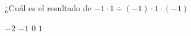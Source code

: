 \documentclass[spanish,letterpaper, 12pt, addpoints, answers]{exam}
\begin{document}
\begin{questions}
    \question[1] ¿Cuál es el resultado de $-1\cdot 1\div (-1)\cdot 1\cdot (-1)$
    \begin{choices}
        \choice $-2$
        \CorrectChoice $-1$
        \choice $0$
        \choice $1$
    \end{choices}
    \vspace{0.15in}

\end{questions}
\end{document}
